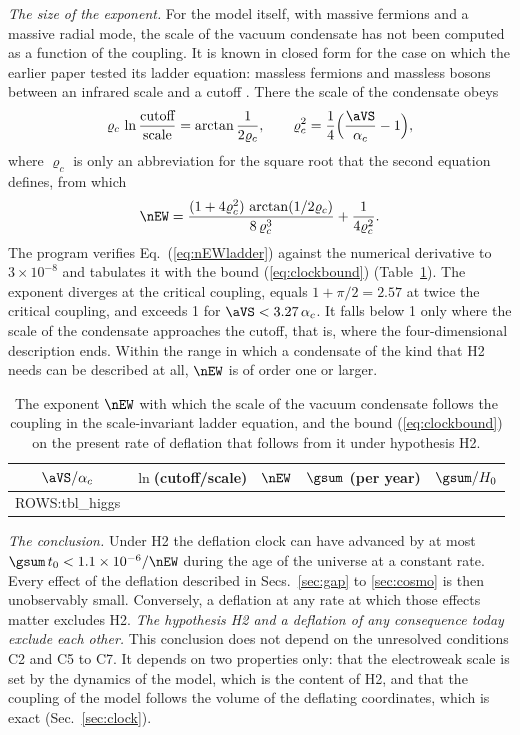 \emph{The size of the exponent.} For the model itself, with massive fermions and a massive radial
mode, the scale of the vacuum condensate has not been computed as a function of the coupling. It is
known in closed form for the case on which the earlier paper tested its ladder equation: massless
fermions and massless bosons between an infrared scale and a cutoff \cite{Miransky1985}. There the
scale of the condensate obeys
\begin{equation}
\varrho_c\,\ln\frac{\text{cutoff}}{\text{scale}}=\arctan\frac{1}{2\varrho_c},\qquad
\varrho_c^{2}=\frac14\Big(\frac{\aVS}{\alpha_c}-1\Big),
\end{equation}
where $\varrho_c$ is only an abbreviation for the square root that the second equation defines, from
which
\begin{equation}
\nEW=\frac{(1+4\varrho_c^{2})\,\arctan(1/2\varrho_c)}{8\,\varrho_c^{3}}+\frac{1}{4\varrho_c^{2}}.
\label{eq:nEWladder}
\end{equation}
The program verifies Eq.~(\ref{eq:nEWladder}) against the numerical derivative to $3\times10^{-8}$
and tabulates it with the bound (\ref{eq:clockbound}) (Table~\ref{tab:higgs}). The exponent diverges
at the critical coupling, equals $1+\pi/2=2.57$ at twice the critical coupling, and exceeds 1 for
$\aVS<3.27\,\alpha_c$. It falls below 1 only where the scale of the condensate approaches the cutoff,
that is, where the four-dimensional description ends. Within the range in which a condensate of the
kind that H2 needs can be described at all, $\nEW$ is of order one or larger.

\begin{table}
\caption{\label{tab:higgs}The exponent $\nEW$ with which the scale of the vacuum condensate follows
the coupling in the scale-invariant ladder equation, and the bound (\ref{eq:clockbound}) on the
present rate of deflation that follows from it under hypothesis H2.}
\begin{ruledtabular}
\begin{tabular}{ccccc}
$\aVS/\alpha_c$ & $\ln$(cutoff/scale) & $\nEW$ & $\gsum$ (per year) & $\gsum/H_0$ \\
\hline
{{ROWS:tbl_higgs}}
\end{tabular}
\end{ruledtabular}
\end{table}

\emph{The conclusion.} Under H2 the deflation clock can have advanced by at most
$\gsum\,t_0<1.1\times10^{-6}/\nEW$ during the age of the universe at a constant rate. Every effect of
the deflation described in Secs.~\ref{sec:gap} to \ref{sec:cosmo} is then unobservably small.
Conversely, a deflation at any rate at which those effects matter excludes H2. \emph{The hypothesis
H2 and a deflation of any consequence today exclude each other.} This conclusion does not depend on
the unresolved conditions C2 and C5 to C7. It depends on two properties only: that the electroweak
scale is set by the dynamics of the model, which is the content of H2, and that the coupling of the
model follows the volume of the deflating coordinates, which is exact (Sec.~\ref{sec:clock}).

